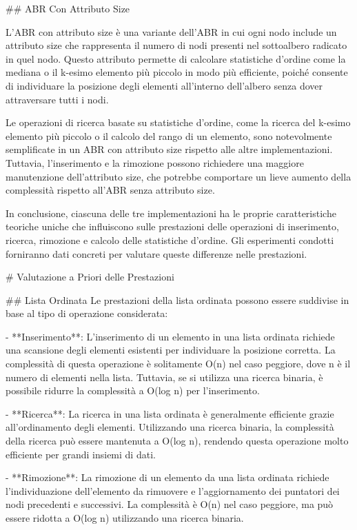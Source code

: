 \documentclass[twocolumn]{article}
\begin{document}
\begin{markdown}
## ABR Con Attributo Size

L'ABR con attributo size è una variante dell'ABR in cui ogni nodo include un attributo size che rappresenta il numero di nodi presenti nel sottoalbero radicato in quel nodo. Questo attributo permette di calcolare statistiche d'ordine come la mediana o il k-esimo elemento più piccolo in modo più efficiente, poiché consente di individuare la posizione degli elementi all'interno dell'albero senza dover attraversare tutti i nodi.

Le operazioni di ricerca basate su statistiche d'ordine, come la ricerca del k-esimo elemento più piccolo o il calcolo del rango di un elemento, sono notevolmente semplificate in un ABR con attributo size rispetto alle altre implementazioni. Tuttavia, l'inserimento e la rimozione possono richiedere una maggiore manutenzione dell'attributo size, che potrebbe comportare un lieve aumento della complessità rispetto all'ABR senza attributo size.

In conclusione, ciascuna delle tre implementazioni ha le proprie caratteristiche teoriche uniche che influiscono sulle prestazioni delle operazioni di inserimento, ricerca, rimozione e calcolo delle statistiche d'ordine. Gli esperimenti condotti forniranno dati concreti per valutare queste differenze nelle prestazioni.

# Valutazione a Priori delle Prestazioni

## Lista Ordinata
Le prestazioni della lista ordinata possono essere suddivise in base al tipo di operazione considerata:

- **Inserimento**: L'inserimento di un elemento in una lista ordinata richiede una scansione degli elementi esistenti per individuare la posizione corretta. La complessità di questa operazione è solitamente O(n) nel caso peggiore, dove n è il numero di elementi nella lista. Tuttavia, se si utilizza una ricerca binaria, è possibile ridurre la complessità a O(log n) per l'inserimento.
  
- **Ricerca**: La ricerca in una lista ordinata è generalmente efficiente grazie all'ordinamento degli elementi. Utilizzando una ricerca binaria, la complessità della ricerca può essere mantenuta a O(log n), rendendo questa operazione molto efficiente per grandi insiemi di dati.
  
- **Rimozione**: La rimozione di un elemento da una lista ordinata richiede l'individuazione dell'elemento da rimuovere e l'aggiornamento dei puntatori dei nodi precedenti e successivi. La complessità è O(n) nel caso peggiore, ma può essere ridotta a O(log n) utilizzando una ricerca binaria.


\end{markdown}
\end{document}
